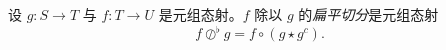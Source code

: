 



\begin{definition}
    设 $g: S \to T$ 与 $f:T \to U$ 是元组态射。$f$ 除以 $g$ 的{\it 扁平切分}是元组态射 
    \[
    f \oslash^\flat g = f \circ (g \star g^c).
    \]
\end{definition}


